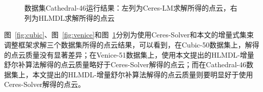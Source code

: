 \begin{figure}[htb!]
    ~
    \\
    ~
    \caption{数据集Cathedral-46运行结果：左列为Ceres-LM求解所得的点云，右列为HLMDL求解所得的点云}
    \label{fig:cathedral}
\end{figure}

图~\ref{fig:cubic}、图~\ref{fig:venice}和图~\ref{fig:cathedral}分别为使用Ceres-Solver和本文的增量式集束调整框架求解三个数据集所得的点云结果，可以看到，在Cubic-50数据集上，解得的点云质量没有显著差异；在Venice-51数据集上，使用本文提出的HLMDL-增量舒尔补算法解得的点云质量略好于Ceres-Solver解得的点云；而在Cathedral-46数据集上，本文提出的HLMDL-增量舒尔补算法解得的点云质量则要明显好于使用Ceres-Solver解得的点云。

